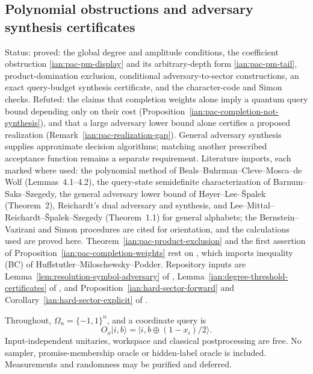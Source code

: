 \subsection{Polynomial obstructions and adversary synthesis certificates}\label{ian:polynomial-adversary-certificates}

Status: proved: the global degree and amplitude conditions, the coefficient obstruction \eqref{ian:pac-pm-display} and its arbitrary-depth form \eqref{ian:pac-pm-tail}, product-domination exclusion, conditional adversary-to-sector constructions, an exact query-budget synthesis certificate, and the character-code and Simon checks. Refuted: the claims that completion weights alone imply a quantum query bound depending only on their cost (Proposition~\ref{ian:pac-completion-not-synthesis}), and that a large adversary lower bound alone certifies a proposed realization (Remark~\ref{ian:pac-realization-gap}). General adversary synthesis supplies approximate decision algorithms; matching another prescribed acceptance function remains a separate requirement. Literature imports, each marked where used: the polynomial method of Beals--Buhrman--Cleve--Mosca--de Wolf (Lemmas~4.1--4.2), the query-state semidefinite characterization of Barnum--Saks--Szegedy, the general adversary lower bound of H{\o}yer--Lee--{\v S}palek (Theorem~2), Reichardt's dual adversary and synthesis, and Lee--Mittal--Reichardt--{\v S}palek--Szegedy (Theorem~1.1) for general alphabets; the Bernstein--Vazirani and Simon procedures are cited for orientation, and the calculations used are proved here. Theorem~\ref{ian:pac-product-exclusion} and the first assertion of Proposition~\ref{ian:pac-completion-weights} rest on , which imports inequality (BC) of Huffstutler--Miloschewsky--Podder. Repository inputs are Lemma~\ref{lem:resolution-symbol-adversary} of , Lemma~\ref{ian:degree-threshold-certificates} of , and Proposition~\ref{ian:hard-sector-forward} and Corollary~\ref{ian:hard-sector-explicit} of .

Throughout, \(\Omega_n=\{-1,1\}^n\), and a coordinate query is
\[
 O_x|i,b\rangle
   =|i,b\oplus(1-x_i)/2\rangle.
\]
Input-independent unitaries, workspace and classical postprocessing are free. No sampler, promise-membership oracle or hidden-label oracle is included. Measurements and randomness may be purified and deferred.


